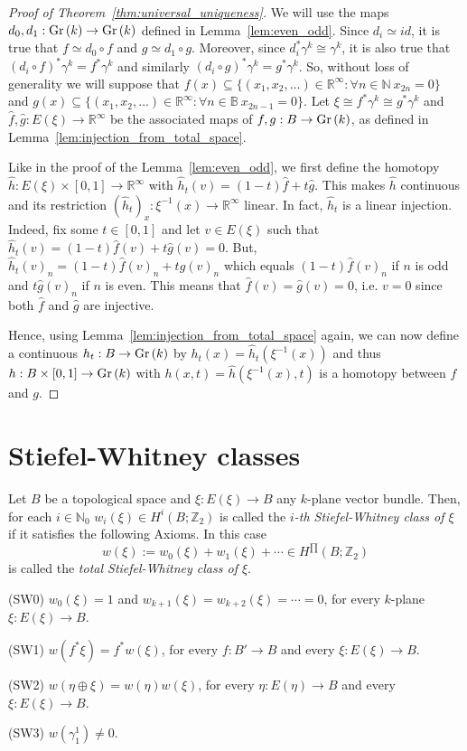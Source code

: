 \begin{proof}[Proof of Theorem~\ref{thm:universal_uniqueness}] We will use the maps $d_0,d_1:\Gr{k}\to\Gr{k}$ defined in Lemma~\ref{lem:even_odd}. Since $d_i\simeq id$, it is true that $f\simeq d_0\circ f$ and $g\simeq d_1\circ g$. Moreover, since $d_i^*\gamma^k\cong\gamma^k$, it is also true that $(d_i\circ f)^*\gamma^k=f^*\gamma^k$ and similarly $(d_i\circ g)^*\gamma^k=g^*\gamma^k$. So, without loss of generality we will suppose that $f(x)\subseteq\{(x_1,x_2,\ldots)\in\mathbb{R}^{\infty}:\forall n\in\mathbb{N}\ x_{2n}=0\}$ and $g(x)\subseteq\{(x_1,x_2,\ldots)\in\mathbb{R}^{\infty}:\forall n\in\mathbb{B}\ x_{2n-1}=0\}$. Let $\xi\cong f^*\gamma^k\cong g^*\gamma^k$ and $\hat{f},\hat{g}:E(\xi)\to\mathbb{R}^{\infty}$ be the associated maps of $f,g:B\to\Gr{k}$, as defined in Lemma~\ref{lem:injection_from_total_space}.

Like in the proof of the Lemma~\ref{lem:even_odd}, we first define the homotopy $\hat{h}:E(\xi)\times[0,1]\to\mathbb{R}^{\infty}$ with $\hat{h}_t(v)=(1-t)\hat{f}+t\hat{g}$. This makes $\hat{h}$ continuous and its restriction $(\hat{h}_t)_x:\xi^{-1}(x)\to\mathbb{R}^{\infty}$ linear. In fact, $\hat{h}_t$ is a linear injection. Indeed, fix some $t\in[0,1]$ and let $v\in E(\xi)$ such that $\hat{h}_t(v)=(1-t)\hat{f}(v)+t\hat{g}(v)=0$. But, $\hat{h}_t(v)_n=(1-t)\hat{f}(v)_n+t\hat{g}(v)_n$ which equals $(1-t)\hat{f}(v)_n$ if $n$ is odd and $t\hat{g}(v)_n$ if $n$ is even. This means that $\hat{f}(v)=\hat{g}(v)=0$, i.e. $v=0$ since both $\hat{f}$ and $\hat{g}$ are injective.

Hence, using Lemma~\ref{lem:injection_from_total_space} again, we can now define a continuous $h_t:B\to\Gr{k}$ by $h_t(x)=\hat{h}_t(\xi^{-1}(x))$ and thus $h:B\times[0,1]\to\Gr{k}$ with $h(x,t)=\hat{h}(\xi^{-1}(x),t)$ is a homotopy between $f$ and $g$.
\end{proof}

\section{Stiefel-Whitney classes}
\begin{axioms} Let $B$ be a topological space and $\xi:E(\xi)\to B$ any $k$-plane vector bundle. Then, for each $i\in\mathbb{N}_0$ $w_i(\xi)\in H^i(B;\mathbb{Z}_2)$ is called the \emph{$i$-th Stiefel-Whitney class of $\xi$} if it satisfies the following Axioms. In this case
\[w(\xi):=w_0(\xi)+w_1(\xi)+\cdots\in H^{\prod}(B;\mathbb{Z}_2)\]
is called the \emph{total Stiefel-Whitney class of $\xi$}.
\begin{b_item}
\item[(SW0)] $w_0(\xi)=1$ and $w_{k+1}(\xi)=w_{k+2}(\xi)=\cdots=0$, for every $k$-plane $\xi:E(\xi)\to B$.
\item[(SW1)] $w(f^*\xi)=f^*w(\xi)$, for every $f:B'\to B$ and every $\xi:E(\xi)\to B$.
\item[(SW2)] $w(\eta\oplus\xi)=w(\eta)w(\xi)$, for every $\eta:E(\eta)\to B$ and every $\xi:E(\xi)\to B$.
\item[(SW3)] $w(\gamma_1^1)\neq0$.
\end{b_item}
\end{axioms}

